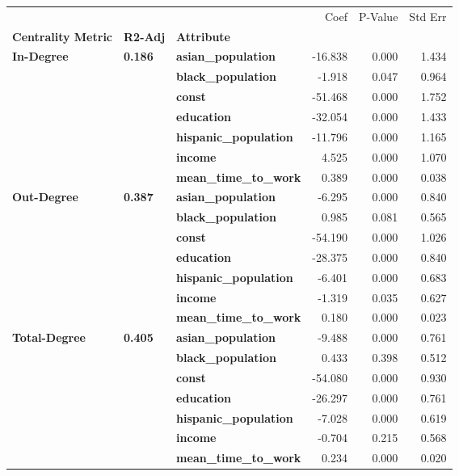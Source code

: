 \begin{tabular}{lllrrr}
\toprule
             &       &                   &    Coef &  P-Value &  Std Err \\
\textbf{Centrality Metric} & \textbf{R2-Adj} & \textbf{Attribute} &         &          &          \\
\midrule
\multirow{7}{*}{\textbf{In-Degree}} & \multirow{7}{*}{\textbf{0.186}} & \textbf{asian\_population} & -16.838 &    0.000 &    1.434 \\
             &       & \textbf{black\_population} &  -1.918 &    0.047 &    0.964 \\
             &       & \textbf{const} & -51.468 &    0.000 &    1.752 \\
             &       & \textbf{education} & -32.054 &    0.000 &    1.433 \\
             &       & \textbf{hispanic\_population} & -11.796 &    0.000 &    1.165 \\
             &       & \textbf{income} &   4.525 &    0.000 &    1.070 \\
             &       & \textbf{mean\_time\_to\_work} &   0.389 &    0.000 &    0.038 \\
\cline{1-6}
\cline{2-6}
\multirow{7}{*}{\textbf{Out-Degree}} & \multirow{7}{*}{\textbf{0.387}} & \textbf{asian\_population} &  -6.295 &    0.000 &    0.840 \\
             &       & \textbf{black\_population} &   0.985 &    0.081 &    0.565 \\
             &       & \textbf{const} & -54.190 &    0.000 &    1.026 \\
             &       & \textbf{education} & -28.375 &    0.000 &    0.840 \\
             &       & \textbf{hispanic\_population} &  -6.401 &    0.000 &    0.683 \\
             &       & \textbf{income} &  -1.319 &    0.035 &    0.627 \\
             &       & \textbf{mean\_time\_to\_work} &   0.180 &    0.000 &    0.023 \\
\cline{1-6}
\cline{2-6}
\multirow{7}{*}{\textbf{Total-Degree}} & \multirow{7}{*}{\textbf{0.405}} & \textbf{asian\_population} &  -9.488 &    0.000 &    0.761 \\
             &       & \textbf{black\_population} &   0.433 &    0.398 &    0.512 \\
             &       & \textbf{const} & -54.080 &    0.000 &    0.930 \\
             &       & \textbf{education} & -26.297 &    0.000 &    0.761 \\
             &       & \textbf{hispanic\_population} &  -7.028 &    0.000 &    0.619 \\
             &       & \textbf{income} &  -0.704 &    0.215 &    0.568 \\
             &       & \textbf{mean\_time\_to\_work} &   0.234 &    0.000 &    0.020 \\
\bottomrule
\end{tabular}
